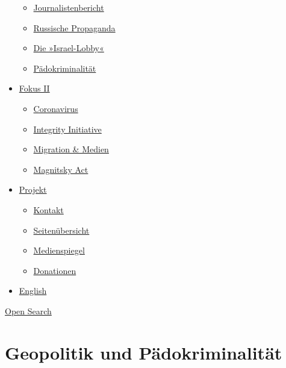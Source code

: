 \begin{itemize}
  \begin{itemize}
  \tightlist
  \item
    \href{https://swprs.org/bericht-eines-journalisten/}{Journalistenbericht}
  \item
    \href{https://swprs.org/russische-propaganda/}{Russische Propaganda}
  \item
    \href{https://swprs.org/die-israel-lobby-fakten-und-mythen/}{Die
    »Israel-Lobby«}
  \item
    \href{https://swprs.org/geopolitik-und-paedokriminalitaet/}{Pädokriminalität}
  \end{itemize}
\item
  \href{https://swprs.org/migration-und-medien/}{Fokus II}

  \begin{itemize}
  \tightlist
  \item
    \href{https://swprs.org/covid-19-hinweis-ii/}{Coronavirus}
  \item
    \href{https://swprs.org/die-integrity-initiative/}{Integrity
    Initiative}
  \item
    \href{https://swprs.org/migration-und-medien/}{Migration \& Medien}
  \item
    \href{https://swprs.org/der-fall-magnitsky/}{Magnitsky Act}
  \end{itemize}
\item
  \href{https://swprs.org/kontakt/}{Projekt}

  \begin{itemize}
  \tightlist
  \item
    \href{https://swprs.org/kontakt/}{Kontakt}
  \item
    \href{https://swprs.org/uebersicht/}{Seitenübersicht}
  \item
    \href{https://swprs.org/medienspiegel/}{Medienspiegel}
  \item
    \href{https://swprs.org/donationen/}{Donationen}
  \end{itemize}
\item
  \href{https://swprs.org/contact/}{English}
\end{itemize}

\protect\hyperlink{}{Open Search}

\hypertarget{geopolitik-und-puxe4dokriminalituxe4t}{%
\section{Geopolitik und
Pädokriminalität}\label{geopolitik-und-puxe4dokriminalituxe4t}}

